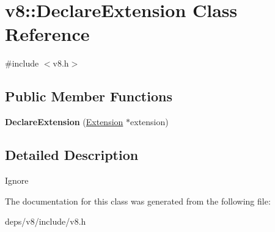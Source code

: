 \hypertarget{classv8_1_1_declare_extension}{}\section{v8\+:\+:Declare\+Extension Class Reference}
\label{classv8_1_1_declare_extension}


{\ttfamily \#include $<$v8.\+h$>$}

\subsection*{Public Member Functions}
\begin{DoxyCompactItemize}
\item 
\hypertarget{classv8_1_1_declare_extension_a52aba29899370dcc367b93115a829289}{}{\bfseries Declare\+Extension} (\hyperlink{classv8_1_1_extension}{Extension} $\ast$extension)\label{classv8_1_1_declare_extension_a52aba29899370dcc367b93115a829289}

\end{DoxyCompactItemize}


\subsection{Detailed Description}
Ignore 

The documentation for this class was generated from the following file\+:\begin{DoxyCompactItemize}
\item 
deps/v8/include/v8.\+h\end{DoxyCompactItemize}
